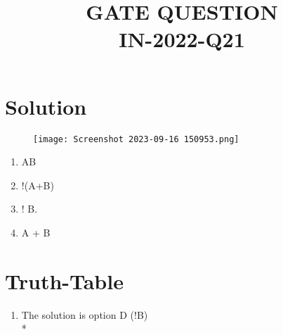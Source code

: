 \documentclass[20pt]{article}
\begin{document}
\title{GATE QUESTION\\IN-2022-Q21}
\maketitle
\section{Solution}
              \begin{figure}[h!]
                  \texttt{[image: Screenshot 2023-09-16 150953.png]}		
              \end{figure}   
            \begin{enumerate}
                \item  AB
			\item  !(A+B)
			\item! B.
                \item  A + B
            \end{enumerate}
\section{Truth-Table}        
            \begin{enumerate}
                   \begin{figure}[h!]
                    \texttt{[image: Screenshot 2023-09-17 112839.png]}
                   \end{figure}
                \item The solution is option D (!B) \\*
            \end{enumerate}
            
\end{document}
